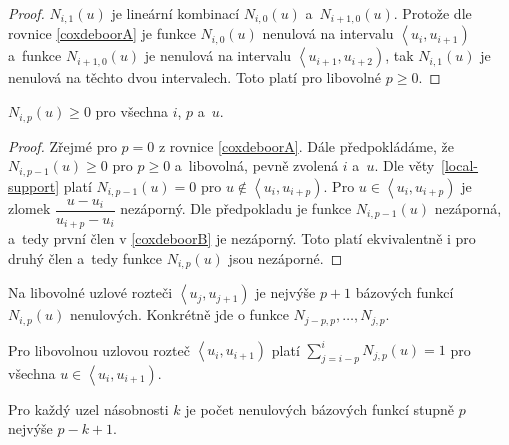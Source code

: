 \begin{proof}
	${N}_{i,1}\left(u\right)$ je lineární kombinací ${N}_{i,0}\left(u\right)$ a~${N}_{i+1,0}\left(u\right)$. Protože dle rovnice \eqref{coxdeboorA} je funkce ${N}_{i,0}\left(u\right)$ nenulová na intervalu $\left\langle u_i, u_{i+1}\right)$ a~funkce ${N}_{i+1,0}\left(u\right)$ je nenulová na intervalu $\left\langle u_{i+1}, u_{i+2}\right)$, tak ${N}_{i,1}\left(u\right)$ je nenulová na těchto dvou intervalech. Toto platí pro libovolné $p\geq0$.
\end{proof}

\begin{veta}[Nezápornost]
	${N}_{i,p}\left(u\right)\geq 0$ pro všechna $i$, $p$ a~$u$.
\end{veta}

\begin{proof}
	Zřejmé pro $p=0$ z rovnice \eqref{coxdeboorA}. Dále předpokládáme, že ${N}_{i,p-1}\left(u\right)\geq 0$ pro  $p\geq0$ a~libovolná, pevně zvolená $i$ a~$u$. Dle věty~\ref{local-support} platí ${N}_{i,p-1}\left(u\right)=0$ pro $u\notin\left\langle u_i, u_{i+p}\right)$. Pro $u\in\left\langle u_i, u_{i+p}\right)$ je zlomek $\dfrac{u-u_i}{u_{i+p}-u_i}$ nezáporný. Dle předpokladu je funkce ${N}_{i,p-1}\left(u\right)$ nezáporná, a~tedy první člen v \eqref{coxdeboorB} je nezáporný. Toto platí ekvivalentně i pro druhý člen a~tedy funkce ${N}_{i,p}\left(u\right)$ jsou nezáporné.
\end{proof}

\begin{veta}
	Na libovolné uzlové rozteči $\left\langle u_j, u_{j+1}\right)$ je nejvýše $p+1$ bázových funkcí ${N}_{i,p}\left(u\right)$ nenulových. Konkrétně jde o funkce $N_{j-p,p},\dots,N_{j,p}$.
\end{veta}

\begin{veta}%
	\label{partition-of-unity}
	Pro libovolnou uzlovou rozteč $\left\langle u_i, u_{i+1}\right)$ platí $\sum_{j=i-p}^{i}N_{j,p}\left(u\right)=1$ pro všechna $u\in\left\langle u_i, u_{i+1}\right)$.
\end{veta}

%	

\begin{veta}\label{multiple-knots}
	Pro každý uzel násobnosti $k$ je počet nenulových bázových funkcí stupně $p$ nejvýše $p-k+1$.
\end{veta}


